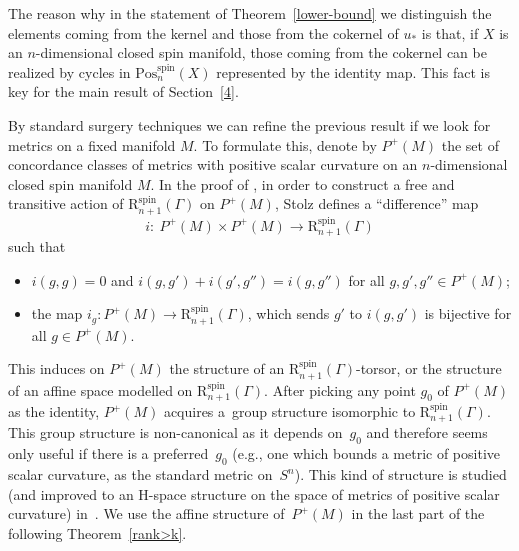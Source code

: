 \documentclass[10pt,a4paper]{amsart}
\numberwithin{equation}{section}
\DeclareMathOperator{\spin}{spin}
\begin{document}
 The reason why in the statement of Theorem~\ref{lower-bound} we
 distinguish the elements coming from the kernel and those from the cokernel
 of $u_*$ is that, if $X$ is an $n$-dimensional closed spin manifold, those coming
 from the cokernel can be realized by cycles in $ \mathrm{Pos}^{\spin}_{n}(X)$
 represented by the identity map. This fact is key for the main result of
 Section~\ref{4}.

By standard surgery techniques we can refine the previous result if we look
 for metrics on a fixed manifold $M$. To formulate this, denote by $P^+(M)$ the set of concordance classes of metrics with positive scalar curvature on an $n$-dimensional closed spin manifold $M$.
 In the proof of \cite[Theorem~5.4]{Stolz}, in order to construct a free and
 transitive action of $\mathrm{R}^{\spin}_{n+1}(\Gamma)$ on $P^+(M)$, Stolz
 defines a ``difference'' map
 \begin{equation}\label{i-map}i\colon \ P^+(M)\times P^+(M)\to \mathrm{R}^{\spin}_{n+1}(\Gamma)\end{equation} such that
 \begin{itemize}\itemsep=0pt
 \item $i(g,g)=0$ and $i(g,g')+i(g',g'')= i(g,g'')$ for all $g,g',g''\in P^+(M)$;
 \item the map $i_g\colon P^+(M)\to \mathrm{R}^{\spin}_{n+1}(\Gamma)$, which sends $g'$ to $i(g,g')$ is bijective for all $g\in P^+(M)$.
 \end{itemize}
 This induces on $P^+(M)$ the structure of an
 $\mathrm{R}^{\spin}_{n+1}(\Gamma)$-torsor, or the structure of an affine space
 modelled on $\mathrm{R}^{\spin}_{n+1}(\Gamma)$.
 After picking any point $g_0$ of
 $P^+(M)$
 as the identity,
 $P^+(M)$
 acquires a~group structure isomorphic to
 $\mathrm{R}^{\spin}_{n+1}(\Gamma)$. This group structure is
 non-canonical as it depends on~$g_0$ and therefore seems only useful if there is a preferred~$g_0$
 (e.g., one which bounds a metric of positive scalar curvature, as the standard
 metric on~$S^n$). This kind of structure is studied (and improved to an
 H-space structure on the space of metrics of positive scalar
 curvature) in~\cite{Frenck}. We use the affine structure of~$P^+(M)$
 in the last part of the following Theorem~\ref{rank>k}.
\end{document}
